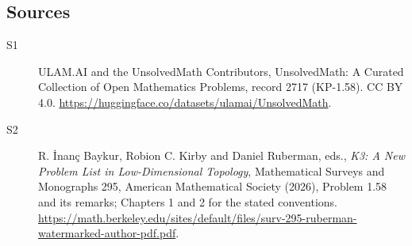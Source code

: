 \documentclass[11pt]{article}
\begin{document}
\subsection{Sources}
\begin{description}
\item[\hypertarget{source:2717:1}{S1}] ULAM.AI and the UnsolvedMath Contributors, UnsolvedMath: A Curated Collection of Open Mathematics Problems, record 2717 (KP-1.58). CC BY 4.0. \url{https://huggingface.co/datasets/ulamai/UnsolvedMath}.
\item[\hypertarget{source:2717:2}{S2}] R. İnanç Baykur, Robion C. Kirby and Daniel Ruberman, eds., \emph{K3: A New Problem List in Low-Dimensional Topology}, Mathematical Surveys and Monographs 295, American Mathematical Society (2026), Problem 1.58 and its remarks; Chapters 1 and 2 for the stated conventions. \url{https://math.berkeley.edu/sites/default/files/surv-295-ruberman-watermarked-author-pdf.pdf}.
\end{description}
\label{end:2717}
\end{document}
